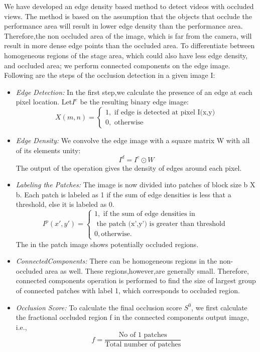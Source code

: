 \documentclass{sig-alternate}
\begin{document}
We have developed an edge density based method to detect videos with occluded views. The method is based on the assumption that the objects that occlude the performance area will result in lower edge density than the performance area. Therefore,the non occluded area of the image, which is far from the camera, will result in more dense edge points than the occluded area. To differentiate between homogeneous regions of the stage area, which could also have less edge density, and occluded area; we perform connected components on the edge image. Following are the steps of the occlusion detection in a given image I:
\begin{itemize}
\item \textit{Edge Detection:} In the first step,we calculate the presence of an edge at each pixel location. Let\(I^e\) be the resulting binary edge image:
\begin{equation}
X(m,n)=\begin{cases}
1,\text{ if edge is detected at pixel I(x,y)}\\
0,\text{ otherwise}
\end{cases}
\end{equation}
\item \textit{ Edge Density:} We convolve the edge image with a square matrix W with all of its elements unity:
\begin{equation}
 I^d = I^e \odot W
\end{equation}
 The output of the operation gives the density of edges around each pixel. 
\item \textit{ Labeling the Patches:} The image is now divided into patches of block size b X b. Each patch is labeled as 1 if the sum of edge densities is less that a threshold, else it is labeled as 0.
\begin{equation}
I^p(x',y')=
\begin{cases}
1,\text{ if the sum of edge densities in}\\
	\text{   the patch (x',y') is greater than threshold }\\
0, \text{otherwise}. 
\end{cases}
\end{equation}
The  in the patch image shows potentially occluded regions.

\item  \textit{ConnectedComponents:} There can be homogeneous regions in the non-occluded area as well. These regions,however,are generally small. Therefore, connected components operation is performed to find the size of largest group of connected patches with label 1, which corresponds to occluded region. 

\item \textit{Occlusion Score:} To calculate the ﬁnal occlusion score \(S^0\), we ﬁrst calculate the fractional occluded region f in the connected components output image, i.e.,
\begin{equation}
f =
\frac{\text{No of 1 patches}}{\text{Total number of patches}}
\end{equation}

\end{itemize}
\end{document}

